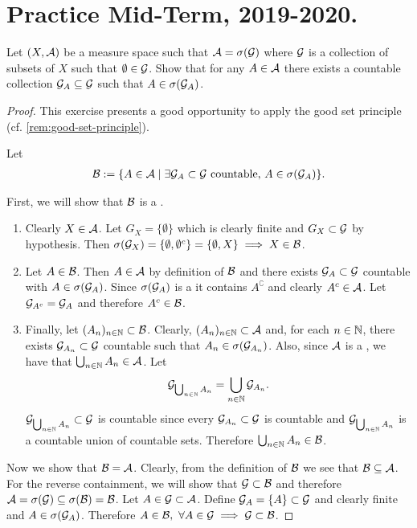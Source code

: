 \section{Practice Mid-Term, 2019-2020.}

\begin{ex}
	Let $(X, \mathcal{A})$ be a measure space such that $\mathcal{A} = \sigma(\mathcal{G})$ where $\mathcal{G}$ is a collection of subsets of $X$ such that $\emptyset \in \mathcal{G}$. Show that for any $A \in \mathcal{A}$ there exists a countable collection $\mathcal{G}_A \subseteq \mathcal{G}$ such that $A \in \sigma(\mathcal{G}_A)$.
\end{ex}

\begin{proof}
	This exercise presents a good opportunity to apply the good set principle (cf. \autoref{rem:good-set-principle}).
	
	Let
	\begin{align*}
		\mathcal{B} := \{ A \in \mathcal{A} \mid \exists \mathcal{G}_A \subset \mathcal{G} \text{ countable, } A \in \sigma(\mathcal{G}_A)\}.
	\end{align*}
	
	First, we will show that $\mathcal{B}$ is a \siga.
	\begin{enumerate}
		\item Clearly $X \in \mathcal{A}$. Let $G_X = \{\emptyset\}$ which is clearly finite and $G_X \subset \mathcal{G}$ by hypothesis. Then $\sigma(\mathcal{G}_X) = \{\emptyset, \emptyset^c\} = \{\emptyset, X\} \implies X \in \mathcal{B}$.
		\item Let $A \in \mathcal{B}$. Then $A \in \mathcal{A}$ by definition of $\mathcal{B}$ and there exists $\mathcal{G}_A \subset \mathcal{G}$ countable with $A \in \sigma(\mathcal{G}_A)$. Since $\sigma(\mathcal{G}_A)$ is a \siga it contains $A^\complement$ and clearly $A^c \in \mathcal{A}$. Let $\mathcal{G}_{A^c} = \mathcal{G}_A$ and therefore $A^c \in \mathcal{B}$.
		\item Finally, let $(A_n)_{n\in\mathbb{N}} \subset \mathcal{B}$. Clearly, $(A_n)_{n\in\mathbb{N}} \subset \mathcal{A}$ and, for each $n \in \mathbb{N}$, there exists $\mathcal{G}_{A_n} \subset \mathcal{G}$ countable such that $A_n \in \sigma(\mathcal{G}_{A_n})$. Also, since $\mathcal{A}$ is a \siga, we have that $\bigcup_{n\in\mathbb{N}}A_n \in \mathcal{A}$. Let
		\begin{align*}
			\mathcal{G}_{\bigcup_{n\in\mathbb{N}} A_n} = \bigcup_{n\in\mathbb{N}} \mathcal{G}_{A_n}.
		\end{align*}
		$\mathcal{G}_{\bigcup_{n\in\mathbb{N}} A_n} \subset \mathcal{G}$ is countable since every $\mathcal{G}_{A_n} \subset \mathcal{G}$ is countable and $\mathcal{G}_{\bigcup_{n\in\mathbb{N}} A_n}$ is a countable union of countable sets. Therefore $\bigcup_{n\in\mathbb{N}} A_n \in \mathcal{B}$.
	\end{enumerate}

	Now we show that $\mathcal{B} = \mathcal{A}$. Clearly, from the definition of $\mathcal{B}$ we see that $\mathcal{B} \subseteq \mathcal{A}$. For the reverse containment, we will show that $\mathcal{G} \subset \mathcal{B}$ and therefore $\mathcal{A} = \sigma(\mathcal{G}) \subseteq \sigma(\mathcal{B}) = \mathcal{B}$. Let $A \in \mathcal{G} \subset \mathcal{A}$. Define $\mathcal{G}_A = \{A\} \subset \mathcal{G}$ and clearly finite and $A \in \sigma(\mathcal{G}_A)$. Therefore $A \in \mathcal{B},\ \forall A \in \mathcal{G} \implies \mathcal{G}\subset \mathcal{B}$.
\end{proof}

